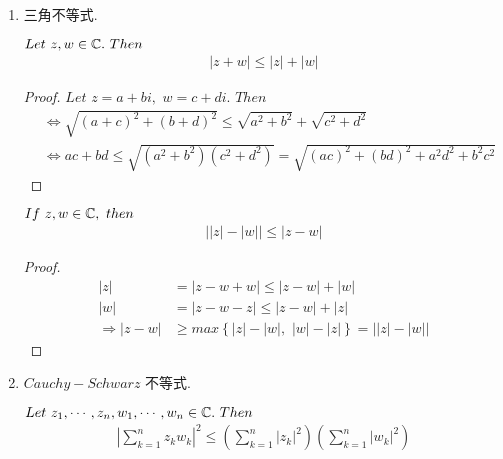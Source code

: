 	\begin{enumerate}
		\item 三角不等式.
		\begin{proposition}
			$Let \,\, z , w \in \mathbb{C} . \,\, Then$
			\begin{align}
				\left| z + w \right| \leq \left| z \right| + \left| w \right|
			\end{align}
			
			\begin{proof}
				$Let \,\, z = a + bi , \,\, w = c + di . \,\, Then$
				\begin{align}
					&\Leftrightarrow \sqrt{(a + c)^2 + (b + d)^2} \leq \sqrt{a^2 + b^2} + \sqrt{c^2 + d^2} \\
					&\Leftrightarrow ac + bd \leq \sqrt{(a^2 + b^2)(c^2 + d^2)} = \sqrt{(ac)^2 + (bd)^2 + a^2 d^2 + b^2 c^2}
				\end{align}
			\end{proof}
		\end{proposition}
	
		\begin{corollary}
			$If \,\, z , w \in \mathbb{C} , \,\, then$
			\begin{align}
				\left| \left| z \right| - \left| w \right| \right| \leq \left| z - w \right|
			\end{align}
		
			\begin{proof}
				\begin{align}
					\left| z \right| &= \left| z - w + w \right| \leq \left| z - w \right| + \left| w \right| \\
					\left| w \right| &= \left| z - w - z \right| \leq \left| z - w \right| + \left| z \right| \\
					\Rightarrow \left| z - w \right| 
					&\geq max\left\{ \left| z \right| - \left| w \right| , \,\, \left| w \right| - \left| z \right| \right\} 
					= \left| \left| z \right| - \left| w \right| \right|
				\end{align}
			\end{proof}
		\end{corollary}
	
		\item $Cauchy - Schwarz$ 不等式.
		\begin{proposition}
			$Let \,\, z_1 , \cdots , z_n , w_1 , \cdots , w_n \in\mathbb{C} . \,\, Then$
			\begin{align}
				\left| \sum_{k = 1}^{n}{z_k w_k} \right|^2 \leq 
				\left( \sum_{k = 1}^{n}{\left| z_k \right|^2} \right)
				\left( \sum_{k = 1}^{n}{\left| w_k \right|^2} \right)
			\end{align}
		

\end{proposition}
\end{enumerate}
